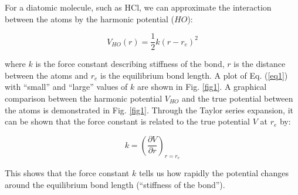 \documentclass[byrevtex,amssymb,aps,pra,floatfix,letterpaper]{revtex4}
\begin{document}
For a diatomic molecule, such as HCl, we can approximate the interaction between the atoms by the harmonic potential ($HO$):

\begin{equation}
V_{HO}(r) = \frac{1}{2}k\left(r - r_e\right)^2
\label{eq1}
\end{equation}

\noindent
where $k$ is the force constant describing stiffness of the bond, $r$ is the distance between the atoms and $r_e$ is the equilibrium bond length. A plot of Eq. (\ref{eq1}) with ``small'' and ``large'' values of $k$ are shown in Fig. \ref{fig1}. A graphical comparison between the harmonic potential $V_{HO}$ and the true potential between the atoms is demonstrated in Fig. \ref{fig1}. Through the Taylor series expansion, it can be shown that the force constant is related to the true potential $V$ at $r_e$ by:

\begin{equation}
k = \left(\frac{\partial V}{\partial r}\right)_{r = r_e}
\label{eq2}
\end{equation}

\noindent
This shows that the force constant $k$ tells us how rapidly the potential changes around the equilibrium bond length (``stiffness of the bond'').
\end{document}
